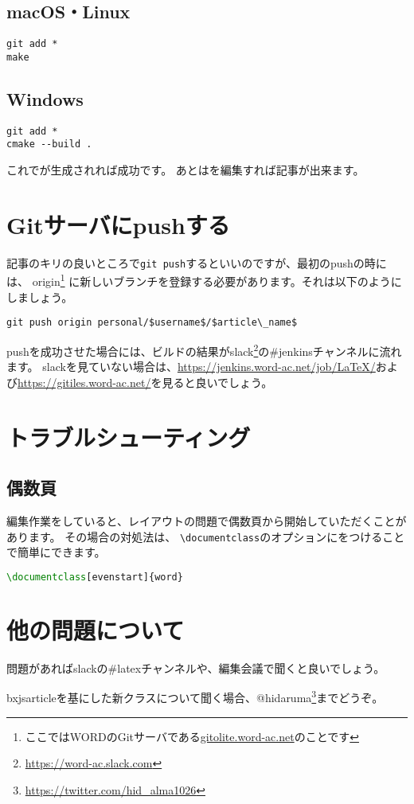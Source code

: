 \documentclass{word}
\begin{document}
\subsection{macOS・Linux}

\begin{lstlisting}
git add *
make
\end{lstlisting}

\subsection{Windows}

\begin{lstlisting}
git add *
cmake --build .
\end{lstlisting}

これでが生成されれば成功です。
あとはを編集すれば記事が出来ます。

\section{Gitサーバにpushする}

記事のキリの良いところで\lstinline|git push|するといいのですが、最初のpushの時には、
origin\footnote{ここではWORDのGitサーバである\url{gitolite.word-ac.net}のことです}%
に新しいブランチを登録する必要があります。それは以下のようにしましょう。

\begin{lstlisting}[mathescape]
git push origin personal/$username$/$article\_name$
\end{lstlisting}

pushを成功させた場合には、ビルドの結果がslack\footnote{\url{https://word-ac.slack.com}}の\#jenkinsチャンネルに流れます。
slackを見ていない場合は、\url{https://jenkins.word-ac.net/job/LaTeX/}および\url{https://gitiles.word-ac.net/}を見ると良いでしょう。

\section{トラブルシューティング}
\subsection{偶数頁}
編集作業をしていると、レイアウトの問題で偶数頁から開始していただくことがあります。
その場合の対処法は、
\lstinline|\documentclass|のオプションにをつけることで簡単にできます。

\begin{lstlisting}[language=TeX, mathescape]
\documentclass[evenstart]{word}
\end{lstlisting}

\section{他の問題について}
問題があればslackの\#latexチャンネルや、編集会議で聞くと良いでしょう。

bxjsarticleを基にした新クラスについて聞く場合、@hidaruma\footnote{\url{https://twitter.com/hid_alma1026}}までどうぞ。
\end{document}
